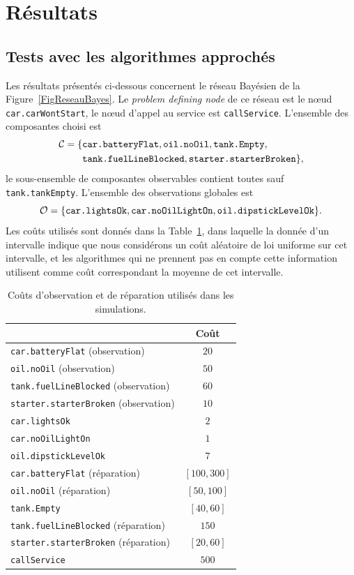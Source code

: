 \documentclass[a4paper,11pt]{article}
\theoremstyle{plain}
\theoremstyle{definition}
\begin{document}
\section{Résultats}
\label{SecResultats}

\subsection{Tests avec les algorithmes approchés}
\label{SecResultatsApprox}

Les résultats présentés ci-dessous concernent le réseau Bayésien de la Figure~\ref{FigReseauBayes}. Le \emph{problem defining node} de ce réseau est le nœud \texttt{car.carWontStart}, le nœud d'appel au service est \texttt{callService}. L'ensemble des composantes choisi est
\begin{align*}
\mathcal C & = \{\text{\texttt{car.batteryFlat}}, \text{\texttt{oil.noOil}}, \text{\texttt{tank.Empty}}, \\
 & \hphantom{{} = \{} \text{\texttt{tank.fuelLineBlocked}}, \text{\texttt{starter.starterBroken}}\},
\end{align*}
le sous-ensemble de composantes observables contient toutes sauf \texttt{tank.tankEmpty}. L'ensemble des observations globales est
\[\mathcal O = \{\text{\texttt{car.lightsOk}}, \text{\texttt{car.noOilLightOn}}, \text{\texttt{oil.dipstickLevelOk}}\}.\]
Les coûts utilisés sont donnés dans la Table~\ref{TabCosts}, dans laquelle la donnée d'un intervalle indique que nous considérons un coût aléatoire de loi uniforme sur cet intervalle, et les algorithmes qui ne prennent pas en compte cette information utilisent comme coût correspondant la moyenne de cet intervalle.

\begin{table}[ht]
\centering
\caption{Coûts d'observation et de réparation utilisés dans les simulations.}
\label{TabCosts}
\begin{tabular}{lc}
\toprule
 & Coût \tabularnewline
\midrule
\texttt{car.batteryFlat} (observation) & $20$ \tabularnewline
\texttt{oil.noOil} (observation) & $50$ \tabularnewline
\texttt{tank.fuelLineBlocked} (observation) & $60$ \tabularnewline
\texttt{starter.starterBroken} (observation) & $10$ \tabularnewline
\texttt{car.lightsOk} & $2$ \tabularnewline
\texttt{car.noOilLightOn} & $1$ \tabularnewline
\texttt{oil.dipstickLevelOk} & $7$ \tabularnewline
\texttt{car.batteryFlat} (réparation) & $[100, 300]$ \tabularnewline
\texttt{oil.noOil} (réparation) & $[50, 100]$ \tabularnewline
\texttt{tank.Empty} & $[40, 60]$ \tabularnewline
\texttt{tank.fuelLineBlocked} (réparation) & $150$ \tabularnewline
\texttt{starter.starterBroken} (réparation) & $[20, 60]$ \tabularnewline
\texttt{callService} & $500$ \tabularnewline
\bottomrule
\end{tabular}
\end{table}
\end{document}
